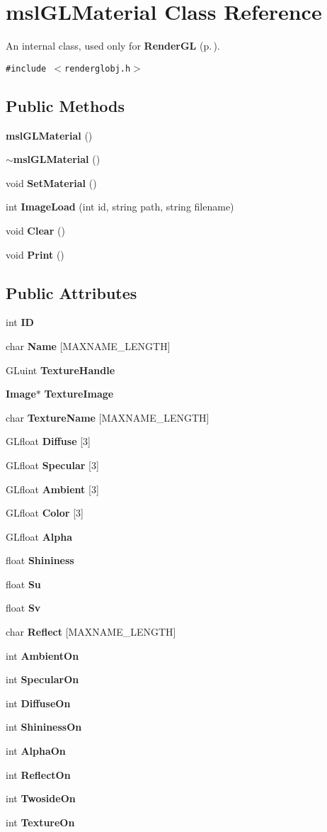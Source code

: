\section{msl\-GLMaterial  Class Reference}
\label{classmslGLMaterial}
An internal class, used only for {\bf Render\-GL} {\rm (p.\,\pageref{classRenderGL})}. 


{\tt \#include $<$renderglobj.h$>$}

\subsection*{Public Methods}
\begin{CompactItemize}
\item 
{\bf msl\-GLMaterial} ()
\item 
{\bf $\sim$msl\-GLMaterial} ()
\item 
void {\bf Set\-Material} ()
\item 
int {\bf Image\-Load} (int id, string path, string filename)
\item 
void {\bf Clear} ()
\item 
void {\bf Print} ()
\end{CompactItemize}
\subsection*{Public Attributes}
\begin{CompactItemize}
\item 
int {\bf ID}
\item 
char {\bf Name} [MAXNAME\_\-LENGTH]
\item 
GLuint {\bf Texture\-Handle}
\item 
{\bf Image}$\ast$ {\bf Texture\-Image}
\item 
char {\bf Texture\-Name} [MAXNAME\_\-LENGTH]
\item 
GLfloat {\bf Diffuse} [3]
\item 
GLfloat {\bf Specular} [3]
\item 
GLfloat {\bf Ambient} [3]
\item 
GLfloat {\bf Color} [3]
\item 
GLfloat {\bf Alpha}
\item 
float {\bf Shininess}
\item 
float {\bf Su}
\item 
float {\bf Sv}
\item 
char {\bf Reflect} [MAXNAME\_\-LENGTH]
\item 
int {\bf Ambient\-On}
\item 
int {\bf Specular\-On}
\item 
int {\bf Diffuse\-On}
\item 
int {\bf Shininess\-On}
\item 
int {\bf Alpha\-On}
\item 
int {\bf Reflect\-On}
\item 
int {\bf Twoside\-On}
\item 
int {\bf Texture\-On}
\end{CompactItemize}


